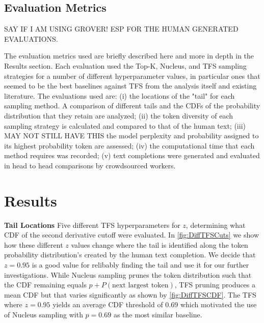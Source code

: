 \documentclass{article}
\begin{document}
\subsection{Evaluation Metrics}

SAY IF I AM USING GROVER! ESP FOR THE HUMAN GENERATED EVALUATIONS.

The evaluation metrics used are briefly described here and more in depth in the Results section. Each evaluation used the Top-K, Nucleus, and TFS sampling strategies for a number of different hyperparameter values, in particular ones that seemed to be the best baselines against TFS from the analysis itself and existing literature. The evaluations used are: (i) the locations of the "tail" for each sampling method. A comparison of different tails and the CDFs of the probability distribution that they retain are analyzed; (ii) the token diversity of each sampling strategy is calculated and compared to that of the human text; (iii) MAY NOT STILL HAVE THIS the model perplexity and probability assigned to its highest probability token are assessed; (iv) the computational time that each method requires was recorded; (v) text completions were generated and evaluated in head to head comparisons by crowdsourced workers.

\section{Results}

\textbf{Tail Locations}
Five different TFS hyperparameters for $z$, determining what CDF of the second derivative cutoff were evaluated. In \ref{fig:DiffTFSCuts} we show how these different $z$ values change where the tail is identified along the token probability distribution's created by the human text completion. We decide that $z=0.95$ is a good value for relibably finding the tail and use it for our further investigations. While Nucleus sampling prunes the token distribution such that the CDF remaining equals $p+P(\text{next largest token})$, TFS pruning produces a mean CDF but that varies significantly as shown by \ref{fig:DiffTFSCDF}. The TFS where $z=0.95$ yields an average CDF threshold of 0.69 which motivated the use of Nucleus sampling with $p=0.69$ as the most similar baseline.  
\end{document}
